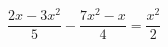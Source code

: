\begin{ex}
	\begin{condition}
		\( \dfrac{2x-3x^2}{5}-\dfrac{7x^2-x}{4}=\dfrac{x^2}{2} \)
	\end{condition}
\end{ex}